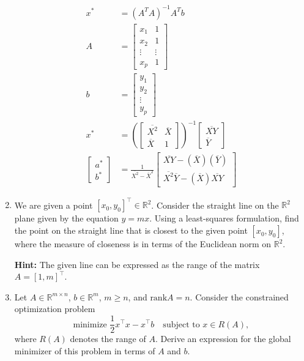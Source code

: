 \documentclass{article}
\begin{document}
\begin{enumerate}
\begin{align*}
x^* &= (A^TA)^{-1} A^T b \\
 A &= \begin{bmatrix}
    x_1 & 1 \\
    x_2 & 1 \\
    \vdots & \vdots \\
    x_p & 1
    \end{bmatrix} \\ b&=\begin{bmatrix}
        y_1 \\ y_2 \\ \vdots \\ y_p
    \end{bmatrix} \\
    x^* &= (\begin{bmatrix}
        \overline{X^2} & \overline{X} \\ \overline{X} & 1 
    \end{bmatrix})^{-1} \begin{bmatrix}
        \overline{XY}
        \\ \overline{Y}
    \end{bmatrix} \\
    \begin{bmatrix}
        a^*\\ b^*
    \end{bmatrix} &= \frac{1}{\overline{X^2} - \overline{X}^2} \begin{bmatrix}
        \overline{XY} - (\overline{X}) (\overline{Y}) \\
        \overline{X^2}\overline{Y} - (\overline{X}) \overline{XY}
    \end{bmatrix}
\end{align*}

\bigbreak
\item We are given a point $[x_0, y_0]^\top \in \mathbb{R}^2$. Consider the straight line on the $\mathbb{R}^2$ plane given by the equation $y = mx$. Using a least-squares formulation, find the point on the straight line that is closest to the given point $[x_0, y_0]$, where the measure of closeness is in terms of the Euclidean norm on $\mathbb{R}^2$. 

\textbf{Hint:} The given line can be expressed as the range of the matrix $A = [1, m]^\top$.

\item 
Let $A \in \mathbb{R}^{m \times n}$, $b \in \mathbb{R}^m$, $m \geq n$, and $\text{rank} A = n$. Consider the constrained optimization problem
\[
\text{minimize } \frac{1}{2} x^\top x - x^\top b \quad \text{subject to } x \in R(A),
\]
where $R(A)$ denotes the range of $A$. Derive an expression for the global minimizer of this problem in terms of $A$ and $b$.



\end{enumerate}
\end{document}
